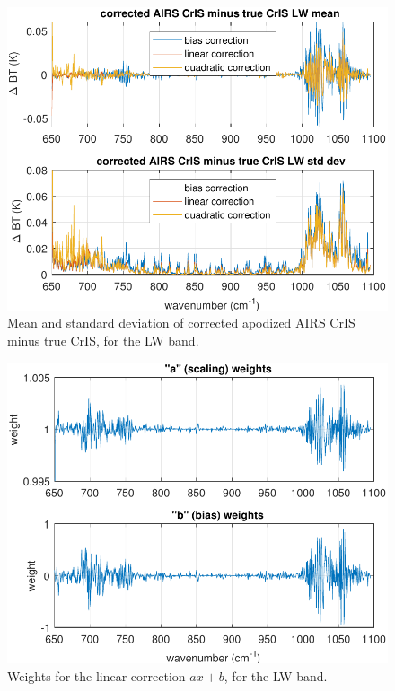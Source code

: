\documentclass[journal]{IEEEtran}
\begin{document}
\begin{figure} %
  \centering
  \includegraphics[width=\linewidth]{figures/a2cris_regr_LW.pdf}
  \caption{Mean and standard deviation of corrected apodized AIRS
    CrIS minus true CrIS, for the LW band.}
  \label{statLW}
\end{figure}

\begin{figure} %
  \centering
  \includegraphics[width=\linewidth]{figures/a2cris_coef_LW.pdf}
  \caption{Weights for the linear correction $ax+b$, for the LW
    band.}
  \label{coefLW}
\end{figure}
\end{document}
